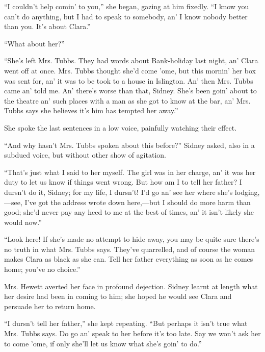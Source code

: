 ``I couldn't help comin' to you,'' she began, gazing at him fixedly. ``I
know you can't do anything, but I had to speak to somebody, {}an' I know
nobody better than you. It's about Clara.''

``What about her?''

``She's left Mrs. Tubbs. They had words about Bank-holiday last night,
an' Clara went off at once. Mrs. Tubbs thought she'd come 'ome, but this
mornin' her box was sent for, an' it was to be took to a house in
Islington. An' then Mrs. Tubbs came an' told me. An' there's worse than
that, Sidney. She's been goin' about to the theatre an' such places with
a man as she got to know at the bar, an' Mrs. Tubbs says she believes
it's him has tempted her away.''

She spoke the last sentences in a low voice, painfully watching their
effect.

``And why hasn't Mrs. Tubbs spoken about this before?'' Sidney asked,
also in a subdued voice, but without other show of agitation.

``That's just what I said to her myself. The girl was in her charge, an'
it was her duty to let us know if things went wrong. But how am I to
tell her father? I dursn't do it, Sidney; for my life, I dursn't! I'd go
{}an' see her where she's lodging,---see, I've got the address wrote
down here,---but I should do more harm than good; she'd never pay any
heed to me at the best of times, an' it isn't likely she would now.''

``Look here! If she's made no attempt to hide away, you may be quite
sure there's no truth in what Mrs. Tubbs says. They've quarrelled, and
of course the woman makes Clara as black as she can. Tell her father
everything as soon as he comes home; you've no choice.''

Mrs. Hewett averted her face in profound dejection. Sidney learnt at
length what her desire had been in coming to him; she hoped he would see
Clara and persuade her to return home.

``I dursn't tell her father,'' she kept repeating. ``But perhaps it
isn't true what Mrs. Tubbs says. Do go an' speak to her before it's too
late. Say we won't ask her to come 'ome, if only she'll let us know what
she's goin' to do.''

